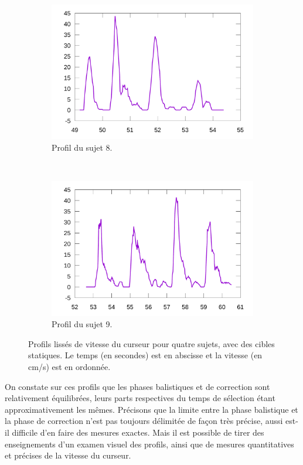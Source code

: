 \begin{figure}[!htb]
\begin{subfigure}[t]{\subImgWlineplot}
			\includegraphics[width=\textwidth]{figures/ch4/subject_08_static_condition_smoothed}
			\caption{Profil du sujet 8.}
			\label{fig:staticProfile8}
		\end{subfigure}
		~
		\begin{subfigure}[t]{\subImgWlineplot}
			\centering
			\includegraphics[width=\textwidth]{figures/ch4/subject_09_static_condition_smoothed}
			\caption{Profil du sujet 9.}
			\label{fig:staticProfile9}
		\end{subfigure}
		\caption[Profils de vitesse du curseur, cibles statiques]{Profils lissés de vitesse du curseur pour quatre sujets, avec des cibles statiques. Le temps (en secondes) est en abscisse et la vitesse (en cm/s) est en ordonnée.}
		\label{fig:staticProfiles}
	\end{figure}
	
	On constate sur ces profils que les phases balistiques et de correction sont relativement équilibrées, leurs parts respectives du temps de sélection étant approximativement les mêmes. Précisons que la limite entre la phase balistique et la phase de correction n'est pas toujours délimitée de façon très précise, aussi est-il difficile d'en faire des mesures exactes. Mais il est possible de tirer des enseignements d'un examen visuel des profils, ainsi que de mesures quantitatives et précises de la vitesse du curseur.
	
